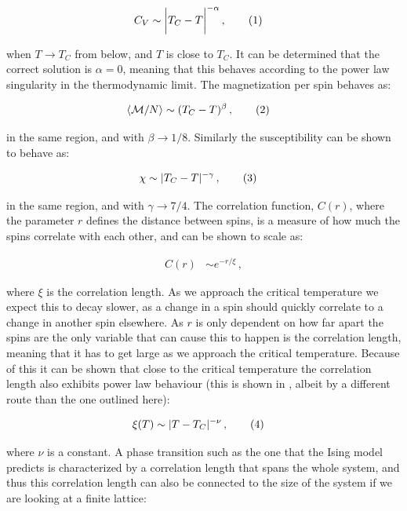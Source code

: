 \documentclass[reprint,english,notitlepage]{revtex4-1}  %
\newcommand\numberthis{\addtocounter{equation}{1}\tag{\theequation}}
\begin{document}
\begin{align*}
C_V &\sim \bigg| T_C - T \bigg| ^{-\alpha} \, , \numberthis \label{eq:power_law_heat_capacity}
\end{align*} 

when $T\to T_C$ from below, and $T$ is close to $T_C$. It can be determined that the correct solution is $\alpha = 0$, meaning that this behaves according to the power law singularity in the thermodynamic limit. The magnetization per spin behaves as:

\begin{align*}
\langle \mathcal{M} / N \rangle &\sim (T_C - T)^{\beta} \, , \numberthis \label{eq:power_law_magnetization_per_spin}
\end{align*}

in the same region, and with $\beta \to 1/8$. Similarly the susceptibility can be shown to behave as:

\begin{align*}
\chi &\sim |T_C - T|^{-\gamma} \, , \numberthis \label{eq:power_law_susceptibility}
\end{align*}

in the same region, and with $\gamma \to 7/4$. The correlation function, $C(r)$, where the parameter $r$ defines the distance between spins, is a measure of how much the spins correlate with each other, and can be shown \citep{Stanley1999} to scale as:

\begin{align*}
C(r) &\sim  e^{-r/\xi} \, ,
\end{align*}

where $\xi$ is the correlation length. As we approach the critical temperature we expect this to decay slower, as a change in a spin should quickly correlate to a change in another spin elsewhere. As $r$ is only dependent on how far apart the spins are the only variable that can cause this to happen is the correlation length, meaning that it has to get large as we approach the critical temperature. Because of this it can be shown that close to the critical temperature the correlation length also exhibits power law behaviour  (this is shown in \citep{Stanley1999}, albeit by a different route than the one outlined here):

\begin{align*}
\xi (T) &\sim |T-T_C|^{-\nu} \, , \numberthis \label{eq:power_law_correlation_length_} 
\end{align*}

where $\nu$ is a constant. A phase transition such as the one that the Ising model predicts is characterized by a correlation length that spans the whole system, and thus this correlation length can also be connected to the size of the system if we are looking at a finite lattice:
\end{document}
